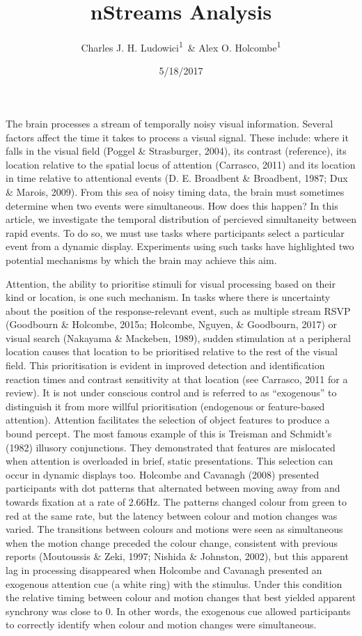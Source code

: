 \documentclass[,man]{apa6}
\title{nStreams Analysis}
\author{Charles J. H. Ludowici\textsuperscript{1}~\& Alex O.
Holcombe\textsuperscript{1}}
\date{5/18/2017}
\affiliation{
\vspace{0.5cm}
\textsuperscript{1} The University of Sydney}
\theoremstyle{definition}
\theoremstyle{definition}
\theoremstyle{definition}
\theoremstyle{remark}
\begin{document}
\maketitle

The brain processes a stream of temporally noisy visual information.
Several factors affect the time it takes to process a visual signal.
These include: where it falls in the visual field (Poggel \&
Strasburger, 2004), its contrast (reference), its location relative to
the spatial locus of attention (Carrasco, 2011) and its location in time
relative to attentional events (D. E. Broadbent \& Broadbent, 1987; Dux
\& Marois, 2009). From this sea of noisy timing data, the brain must
sometimes determine when two events were simultaneous. How does this
happen? In this article, we investigate the temporal distribution of
percieved simultaneity between rapid events. To do so, we must use tasks
where participants select a particular event from a dynamic display.
Experiments using such tasks have highlighted two potential mechanisms
by which the brain may achieve this aim.

Attention, the ability to prioritise stimuli for visual processing based
on their kind or location, is one such mechanism. In tasks where there
is uncertainty about the position of the response-relevant event, such
as multiple stream RSVP (Goodbourn \& Holcombe, 2015a; Holcombe, Nguyen,
\& Goodbourn, 2017) or visual search (Nakayama \& Mackeben, 1989),
sudden stimulation at a peripheral location causes that location to be
prioritised relative to the rest of the visual field. This
prioritisation is evident in improved detection and identification
reaction times and contrast sensitivity at that location (see Carrasco,
2011 for a review). It is not under conscious control and is referred to
as \enquote{exogenous} to distinguish it from more willful
prioritisation (endogenous or feature-based attention). Attention
facilitates the selection of object features to produce a bound percept.
The most famous example of this is Treisman and Schmidt's (1982)
illusory conjunctions. They demonstrated that features are mislocated
when attention is overloaded in brief, static presentations. This
selection can occur in dynamic displays too. Holcombe and Cavanagh
(2008) presented participants with dot patterns that alternated between
moving away from and towards fixation at a rate of 2.66Hz. The patterns
changed colour from green to red at the same rate, but the latency
between colour and motion changes was varied. The transitions between
colours and motions were seen as simultaneous when the motion change
preceded the colour change, consistent with previous reports (Moutoussis
\& Zeki, 1997; Nishida \& Johnston, 2002), but this apparent lag in
processing disappeared when Holcombe and Cavanagh presented an exogenous
attention cue (a white ring) with the stimulus. Under this condition the
relative timing between colour and motion changes that best yielded
apparent synchrony was close to 0. In other words, the exogenous cue
allowed participants to correctly identify when colour and motion
changes were simultaneous.
\end{document}
